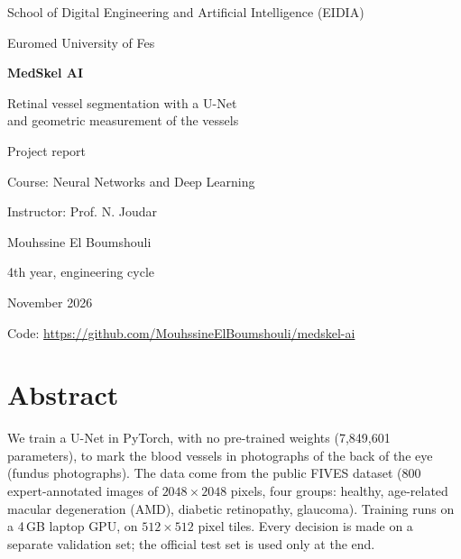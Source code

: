 \documentclass[11pt,a4paper]{article}
\begin{document}
\begin{titlepage}
\centering
{\large School of Digital Engineering and Artificial Intelligence (EIDIA)\par}
{\large Euromed University of Fes\par}
\vspace{2.6cm}
{\Huge\bfseries\color{teal} MedSkel AI\par}
\vspace{0.5cm}
{\LARGE Retinal vessel segmentation with a U-Net\\[2pt] and geometric measurement of the vessels\par}
\vspace{1.4cm}
\vspace{2cm}

{\large Project report\par}
{Course: Neural Networks and Deep Learning\par}
{Instructor: Prof. N. Joudar\par}
\vfill
{\Large Mouhssine El Boumshouli\par}
{4th year, engineering cycle\par}
\vspace{0.4cm}
{November 2026\par}
{\small Code: \url{https://github.com/MouhssineElBoumshouli/medskel-ai}\par}
\end{titlepage}

\section*{Abstract}
We train a U-Net in PyTorch, with no pre-trained weights (7{,}849{,}601 parameters), to mark the blood vessels in photographs of the back of the eye (fundus photographs). The data come from the public FIVES dataset (800 expert-annotated images of $2048\times2048$ pixels, four groups: healthy, age-related macular degeneration (AMD), diabetic retinopathy, glaucoma). Training runs on a 4\,GB laptop GPU, on $512\times512$ pixel tiles. Every decision is made on a separate validation set; the official test set is used only at the end.
\end{document}
